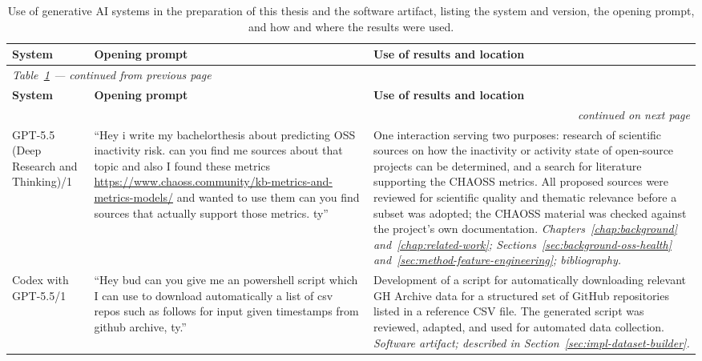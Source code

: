 {\footnotesize
\setlength{\tabcolsep}{4pt}
\renewcommand{\arraystretch}{1.2}
\begin{longtable}{p{} p{} p{}}
\caption{Use of generative AI systems in the preparation of this thesis and the software
artifact, listing the system and version, the opening prompt, and how and where the
results were used.}
\label{tab:ai-prompts} \\
\toprule
\textbf{System} & \textbf{Opening prompt} & \textbf{Use of results and location} \\
\midrule
\endfirsthead
\multicolumn{3}{l}{\small\itshape Table~\ref{tab:ai-prompts} --- continued from previous page} \\
\toprule
\textbf{System} & \textbf{Opening prompt} & \textbf{Use of results and location} \\
\midrule
\endhead
\midrule
\multicolumn{3}{r}{\small\itshape continued on next page} \\
\endfoot
\bottomrule
\endlastfoot

GPT-5.5 (Deep Research and Thinking)/1
& ``Hey i write my bachelorthesis about predicting OSS inactivity risk. can you find me
sources about that topic and also I found these metrics
\url{https://www.chaoss.community/kb-metrics-and-metrics-models/} and wanted to use them
can you find sources that actually support those metrics. ty''
& One interaction serving two purposes: research of scientific sources on how the
inactivity or activity state of open-source projects can be determined, and a search for
literature supporting the CHAOSS metrics. All proposed sources were reviewed for
scientific quality and thematic relevance before a subset was adopted; the CHAOSS
material was checked against the project's own documentation. \newline
\emph{Chapters~\ref{chap:background} and~\ref{chap:related-work};
Sections~\ref{sec:background-oss-health} and~\ref{sec:method-feature-engineering};
bibliography.} \\

Codex with GPT-5.5/1
& ``Hey bud can you give me an powershell script which I can use to download
automatically a list of csv repos such as follows for input given timestamps from
github archive, ty.''
& Development of a script for automatically downloading relevant GH Archive data for a
structured set of GitHub repositories listed in a reference CSV file. The generated
script was reviewed, adapted, and used for automated data collection. \newline
\emph{Software artifact; described in Section~\ref{sec:impl-dataset-builder}.} \\


\end{longtable}}
